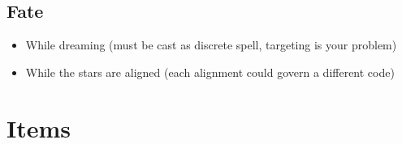 \begin{multicols}{2}
\subsection{Fate}

\begin{itemize}
  \item
  While dreaming (must be cast as discrete spell, targeting is your problem)
  \item
  While the stars are aligned (each alignment could govern a different code)
\end{itemize}

\end{multicols}

\section{Items}

